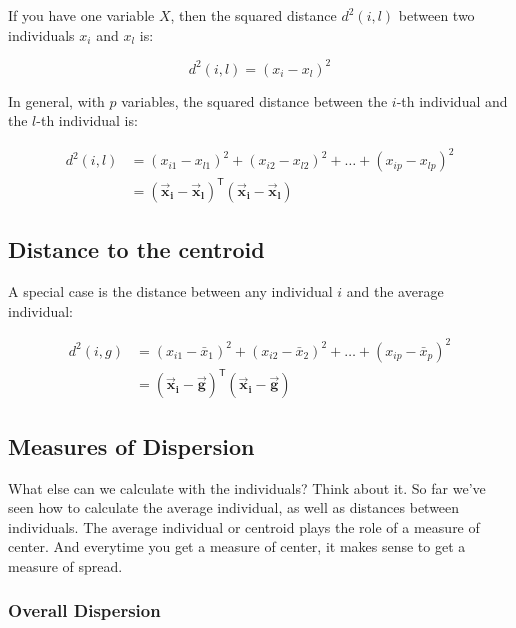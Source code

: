 \documentclass[]{book}
\begin{document}
If you have one variable \(X\), then the squared distance \(d^2(i,l)\) between two individuals \(x_i\) and \(x_l\) is:

\[
d^2(i,l) = (x_i - x_l)^2
\]

In general, with \(p\) variables, the squared distance between the \(i\)-th individual
and the \(l\)-th individual is:

\begin{align*}
d^2(i,l) &= (x_{i1} - x_{l1})^2 + (x_{i2} - x_{l2})^2 + \dots + (x_{ip} - x_{lp})^2 \\
&= (\mathbf{\vec{x}_i} - \mathbf{\vec{x}_l})^\mathsf{T} (\mathbf{\vec{x}_i} - \mathbf{\vec{x}_l})
\end{align*}

\hypertarget{distance-to-the-centroid}{%
\subsection{Distance to the centroid}\label{distance-to-the-centroid}}

A special case is the distance between any individual \(i\) and the average individual:

\begin{align*}
d^2(i,g) &= (x_{i1} - \bar{x}_1)^2 + (x_{i2} - \bar{x}_2)^2 + \dots + (x_{ip} - \bar{x}_p)^2 \\
&= (\mathbf{\vec{x}_i} - \mathbf{\vec{g}})^\mathsf{T} (\mathbf{\vec{x}_i} - \mathbf{\vec{g}})
\end{align*}

\hypertarget{measures-of-dispersion}{%
\subsection{Measures of Dispersion}\label{measures-of-dispersion}}

What else can we calculate with the individuals? Think about it. So far we've
seen how to calculate the average individual, as well as distances between
individuals. The average individual or centroid plays the role of a measure
of center. And everytime you get a measure of center, it makes sense to get a
measure of spread.

\hypertarget{overall-dispersion}{%
\subsubsection*{Overall Dispersion}\label{overall-dispersion}}
\end{document}
